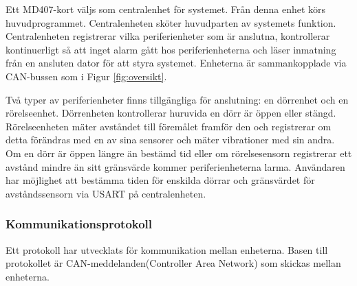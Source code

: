 \documentclass[a4paper]{article}
\begin{document}
Ett MD407-kort väljs som centralenhet för systemet.
Från denna enhet körs huvudprogrammet.
Centralenheten sköter huvudparten av systemets funktion.
Centralenheten registrerar vilka periferienheter som är anslutna, kontrollerar kontinuerligt så att inget alarm gått hos periferienheterna och läser inmatning från en ansluten dator för att styra systemet.
Enheterna är sammankopplade via CAN-bussen som i Figur \ref{fig:oversikt}.

Två typer av periferienheter finns tillgängliga för anslutning: en dörrenhet och en rörelseenhet.
Dörrenheten kontrollerar huruvida en dörr är öppen eller stängd. Rörelseenheten mäter avståndet till föremålet framför den och registrerar om detta förändras med en av sina sensorer och mäter vibrationer med sin andra.
Om en dörr är öppen längre än bestämd tid eller om rörelsesensorn registrerar ett avstånd mindre än sitt gränsvärde kommer periferienheterna larma.
Användaren har möjlighet att bestämma tiden för enskilda dörrar och gränsvärdet för avståndssensorn via USART på centralenheten.

\subsubsection{Kommunikationsprotokoll}
Ett protokoll har utvecklats för kommunikation mellan enheterna.
Basen till protokollet är CAN-meddelanden(Controller Area Network) som skickas mellan enheterna.

\begin{table}[H]
    \centering
    \caption{CAN-meddelandets uppbyggnad och ett exempel på hur ett alarm-meddelande från en periferienhet med ID ett ser ut.}
    \label{tab:meddelandestruktur}

\end{table}

\end{document}

